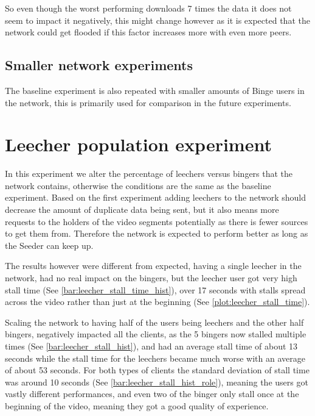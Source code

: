 

So even though the worst performing downloads 7 times the data it does not seem to impact it negatively, this might change however as it is expected that the network could get flooded if this factor increases more with even more peers.

\subsection{Smaller network experiments}
The baseline experiment is also repeated with smaller amounts of Binge users in the network, this is primarily used for comparison in the future experiments.

\section{Leecher population experiment}
In this experiment we alter the percentage of leechers versus bingers that the network contains, otherwise the conditions are the same as the baseline experiment.
Based on the first experiment adding leechers to the network should decrease the amount of duplicate data being sent, but it also means more requests to the holders of the video segments potentially as there is fewer sources to get them from. Therefore the network is expected to perform better as long as the Seeder can keep up.

The results however were different from expected, having a single leecher in the network, had no real impact on the bingers, but the leecher user got very high stall time (See \autoref{bar:leecher_stall_time_hist}), over 17 seconds with stalls spread across the video rather than just at the beginning (See \autoref{plot:leecher_stall_time}). 






Scaling the network to having half of the users being leechers and the other half bingers, negatively impacted all the clients, as the 5 bingers now stalled multiple times (See \autoref{bar:leecher_stall_hist}), and had an average stall time of about 13 seconds while the stall time for the leechers became much worse with an average of about 53 seconds. For both types of clients the standard deviation of stall time was around 10 seconds (See \autoref{bar:leecher_stall_hist_role}), meaning the users got vastly different performances, and even two of the binger only stall once at the beginning of the video, meaning they got a good quality of experience.

